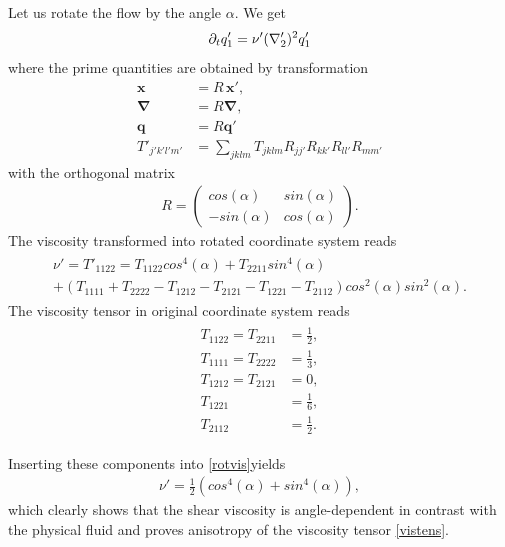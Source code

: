 Let us rotate the flow by the angle $\alpha$.
We get
\begin{equation}
\partial_t q'_1 = \nu' (\nabla'_2)^2 q'_1
\end{equation}
where the prime quantities are obtained by transformation 
\begin{equation}
\begin{split}
\bm{x} &= R \, \bm{ x'}, \\
\bm{\nabla} &= R \bm{\nabla}, \\
\bm{q} &= R \bm{q'} \\
T'_{j'k'l'm'} &= \sum_{jklm} T_{jklm} R_{jj'} R_{kk'} R_{ll'} R_{mm'}
\end{split}
\end{equation}
with the orthogonal matrix
\begin{align}
R = \begin{pmatrix}
cos(\alpha) & sin(\alpha) \\
-sin(\alpha) & cos(\alpha)
\end{pmatrix} .
\end{align}
The viscosity transformed into rotated coordinate system reads
\begin{align} \label{rotvis}
\begin{split}
\nu' = T'_{1122} = T_{1122} cos^4(\alpha) + T_{2211} sin^4(\alpha) \\
+ (T_{1111} + T_{2222} - T_{1212} - T_{2121} - T_{1221} - T_{2112})cos^2(\alpha) sin^2(\alpha).
\end{split}
\end{align}
The viscosity tensor in original coordinate system reads
\begin{align}
\begin{split}
T_{1122} = T_{2211} &= \frac{1}{2}, \\
T_{1111} = T_{2222} &= \frac{1}{3}, \\
T_{1212} = T_{2121} &= 0, \\
T_{1221} &= \frac{1}{6}, \\
T_{2112} &= \frac{1}{2}. 
\end{split}
\end{align}

Inserting these components into \ref{rotvis}yields
\begin{align}
\nu' = \frac{1}{2}(cos^4(\alpha) + sin^4(\alpha)),
\end{align}
which clearly shows that the shear viscosity is angle-dependent in contrast with the physical fluid and proves anisotropy of the viscosity tensor \ref{vistens}.


